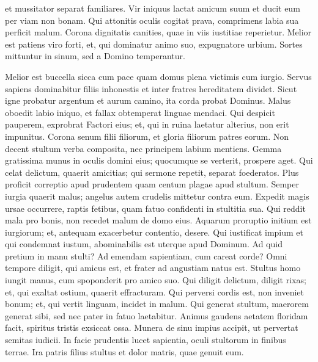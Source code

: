 \begin{biblechapter}
\begin{biblechapter}
\begin{biblechapter}
\begin{biblechapter}
\begin{biblechapter}
\begin{biblechapter}
\begin{biblechapter}
\begin{biblechapter}
\begin{biblechapter}
\begin{biblechapter}
\begin{biblechapter}
\begin{biblechapter}
\begin{biblechapter}
\begin{biblechapter}
\begin{biblechapter}
\begin{biblechapter}
 et mussitator separat familiares.
 \verse Vir iniquus lactat amicum suum
 et ducit eum per viam non bonam.
 \verse Qui attonitis oculis cogitat prava,
 comprimens labia sua perficit malum.
 \verse Corona dignitatis canities,
 quae in viis iustitiae reperietur.
 \verse Melior est patiens viro forti,
 et, qui dominatur animo suo, expugnatore urbium.
 \verse Sortes mittuntur in sinum,
 sed a Domino temperantur.
 
\begin{biblechapter}
 \verse Melior est buccella sicca cum pace
 quam domus plena victimis cum iurgio.
 \verse Servus sapiens dominabitur filiis inhonestis
 et inter fratres hereditatem dividet.
 \verse Sicut igne probatur argentum et aurum camino,
 ita corda probat Dominus.
 \verse Malus oboedit labio iniquo,
 et fallax obtemperat linguae mendaci.
 \verse Qui despicit pauperem, exprobrat Factori eius;
 et, qui in ruina laetatur alterius, non erit impunitus.
 \verse Corona senum filii filiorum,
 et gloria filiorum patres eorum.
 \verse Non decent stultum verba composita,
 nec principem labium mentiens.
 \verse Gemma gratissima munus in oculis domini eius;
 quocumque se verterit, prospere aget.
 \verse Qui celat delictum, quaerit amicitias;
 qui sermone repetit, separat foederatos.
 \verse Plus proficit correptio apud prudentem
 quam centum plagae apud stultum.
 \verse Semper iurgia quaerit malus;
 angelus autem crudelis mittetur contra eum.
 \verse Expedit magis ursae occurrere, raptis fetibus,
 quam fatuo confidenti in stultitia sua.
 \verse Qui reddit mala pro bonis,
 non recedet malum de domo eius.
 \verse Aquarum proruptio initium est iurgiorum;
 et, antequam exacerbetur contentio, desere.
 \verse Qui iustificat impium et qui condemnat iustum,
 abominabilis est uterque apud Dominum.
 \verse Ad quid pretium in manu stulti?
 Ad emendam sapientiam, cum careat corde?
 \verse Omni tempore diligit, qui amicus est,
 et frater ad angustiam natus est.
 \verse Stultus homo iungit manus,
 cum spoponderit pro amico suo.
 \verse Qui diligit delictum, diligit rixas;
 et, qui exaltat ostium, quaerit effracturam.
 \verse Qui perversi cordis est, non inveniet bonum;
 et, qui vertit linguam, incidet in malum.
 \verse Qui generat stultum, maerorem generat sibi,
 sed nec pater in fatuo laetabitur.
 \verse Animus gaudens aetatem floridam facit,
 spiritus tristis exsiccat ossa.
 \verse Munera de sinu impius accipit,
 ut pervertat semitas iudicii.
 \verse In facie prudentis lucet sapientia,
 oculi stultorum in finibus terrae.
 \verse Ira patris filius stultus
 et dolor matris, quae genuit eum.

\end{biblechapter}
\end{biblechapter}
\end{biblechapter}
\end{biblechapter}
\end{biblechapter}
\end{biblechapter}
\end{biblechapter}
\end{biblechapter}
\end{biblechapter}
\end{biblechapter}
\end{biblechapter}
\end{biblechapter}
\end{biblechapter}
\end{biblechapter}
\end{biblechapter}
\end{biblechapter}
\end{biblechapter}
